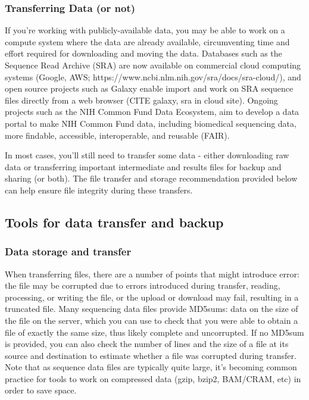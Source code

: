 \documentclass[10pt,letterpaper]{article}
\begin{document}
\subsubsection*{Transferring Data (or not)} 

If you’re working with publicly-available data, you may be able to work on a compute system where the data are already available, circumventing time and effort required for downloading and moving the data.
Databases such as the Sequence Read Archive (SRA) are now available on commercial cloud computing systems (Google, AWS; https://www.ncbi.nlm.nih.gov/sra/docs/sra-cloud/), and open source projects such as Galaxy enable import and work on SRA sequence files directly from a web browser (CITE galaxy, sra in cloud site). Ongoing projects such as the NIH Common Fund Data Ecosystem, aim to develop a data portal to make NIH Common Fund data, including biomedical sequencing data, more findable,
accessible, interoperable, and reusable (FAIR). 

In most cases, you'll still need to transfer some data - either downloading raw data or transferring important intermediate and results files for backup and sharing (or both). The file transfer and storage recommendation provided below can help ensure file integrity during these transfers.


\subsection*{Tools for data transfer and backup} %



\subsubsection*{Data storage and transfer} 
When transferring files, there are a number of points that might introduce error: the file may be corrupted due to errors introduced during transfer, reading, processing, or writing the file, or the upload or download may fail, resulting in a truncated file. 
Many sequencing data files provide MD5sums: data on the size of the file on the server, which you can use to check that you were able to obtain a file of exactly the same size, thus likely complete and uncorrupted. 
If no MD5sum is provided, you can also check the number of lines and the size of a file at its source and destination to estimate whether a file was corrupted during transfer.  
Note that as sequence data files are typically quite large, it's becoming common practice for tools to work on compressed data (gzip, bzip2, BAM/CRAM, etc) in order to save space.
\end{document}
